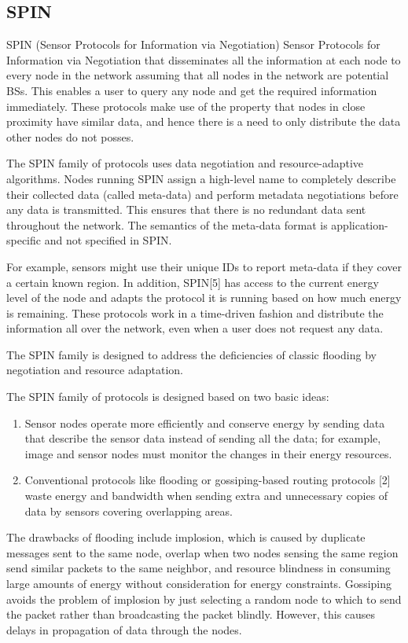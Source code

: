 \documentclass[journal,transmag]{IEEEtran}
\begin{document}
\subsection{SPIN}

SPIN (Sensor Protocols for Information via Negotiation) Sensor Protocols for Information via Negotiation that disseminates all the information at each node to every node in the network assuming that all nodes in the network are potential BSs. This enables a user to query any node and get the required information immediately. These protocols make use of the property that nodes in close proximity have similar data, and hence there is a need to only distribute the data other nodes do not posses.

The SPIN family of protocols uses data negotiation and resource-adaptive algorithms. Nodes running SPIN assign a high-level name to completely describe their collected data (called meta-data) and perform metadata negotiations before any data is transmitted. This ensures that there is no redundant data sent throughout the network. The semantics of the meta-data format is application-specific and not specified in SPIN.

For example, sensors might use their unique IDs to report meta-data if they cover a certain known region. In addition, SPIN[5] has access to the current energy level of the node and adapts the protocol it is running based on how much energy is remaining. These protocols work in a time-driven fashion and distribute the information all over the network, even when a user does not request any data.

The SPIN family is designed to address the deficiencies of classic flooding by negotiation and resource adaptation.

The SPIN family of protocols is designed based on two basic ideas:

\begin{enumerate}
  \item Sensor nodes operate more efficiently and conserve energy by sending data that describe the sensor data instead of sending all the data; for example, image and sensor nodes must monitor the changes in their energy resources.
  \item Conventional protocols like flooding or gossiping-based routing protocols [2] waste energy and bandwidth when sending extra and unnecessary copies of data by sensors covering overlapping areas.
\end{enumerate}

The drawbacks of flooding include implosion, which is caused by duplicate messages sent to the same node, overlap when two nodes sensing the same region send similar packets to the same neighbor, and resource blindness in consuming large amounts of energy without consideration for energy constraints. Gossiping avoids the problem of implosion by just selecting a random node to which to send the packet rather than broadcasting the packet blindly. However, this causes delays in propagation of data through the nodes.
\end{document}
